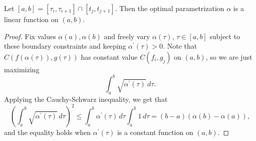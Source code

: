 \documentclass[12pt]{amsart}
\begin{document}

\begin{proposition}
\label{linear}
Let $[a,b] = [\tau_i, \tau_{i+1}] \cap [t_j, t_{j+1}]$. 
Then the optimal parametrization $\alpha$ is a linear function on $(a,b)$.
\end{proposition}
\begin{proof}
Fix values $\alpha(a), \alpha(b)$ and freely vary $\alpha(\tau)$, $\tau\in [a,b]$ subject to these boundary constraints and keeping $\alpha^\prime(\tau) > 0$.  Note that 
$C(f(\alpha(\tau)), g(\tau))$ has constant value $C(f_i, g_j)$ on $(a,b)$, so we are just maximizing
\[\int_{a}^{b} \sqrt{\alpha^\prime(\tau)} \,d\tau.\]  Applying the Cauchy-Schwarz inequality, we get that 
\begin{equation*}
\left( \int_{a}^{b} \sqrt{\alpha^\prime(\tau)} \,d\tau \right)^2 \leq
\int_{a}^{b} \alpha^\prime(\tau) \,d\tau \int_{a}^{b} 1 \,d\tau 
= (b-a) (\alpha(b) - \alpha(a)),
\end{equation*}
and the equality holds when $\alpha^\prime (\tau)$ is a constant function on $(a, b)$.
\end{proof}
\end{document}
